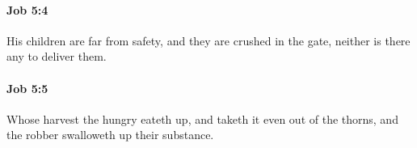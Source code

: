 		\paragraph{Job 5:4} %
			\label{JOB-5-4}

			His children are far from safety, and they are crushed in the gate, neither is there any to deliver them.


		\paragraph{Job 5:5} %
			\label{JOB-5-5}

			Whose harvest the hungry eateth up, and taketh it even out of the thorns, and the robber swalloweth up their substance.


